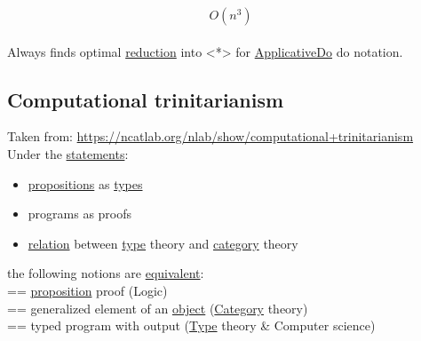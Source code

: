 \documentclass[11pt]{article}
\begin{document}
$$ O(n^3) $$\\
Always finds optimal \hyperref[org102c2e5]{reduction} into <*> for \hyperref[org7ae5ec6]{ApplicativeDo} do notation.\\

\subsection{\label{org98a6daf}Computational trinitarianism}
\label{sec:org0ed0dfc}

Taken from: \url{https://ncatlab.org/nlab/show/computational+trinitarianism}\\

Under the \hyperref[org3a604a1]{statements}:\\

\begin{itemize}
\item \hyperref[org4320b73]{propositions} as \hyperref[org3927fd9]{types}\\

\item programs as proofs\\

\item \hyperref[org6e8ae46]{relation} between \hyperref[org4fbaeb8]{type} theory and \hyperref[org3e3a79b]{category} theory\\
\end{itemize}

the following notions are \hyperref[org6802c96]{equivalent}:\\

== \hyperref[org78bac32]{proposition} proof (Logic)\\

== generalized element of an \hyperref[org025aac8]{object} (\hyperref[org3e3a79b]{Category} theory)\\

== typed program with output (\hyperref[org4fbaeb8]{Type} theory \& Computer science)\\
\end{document}
